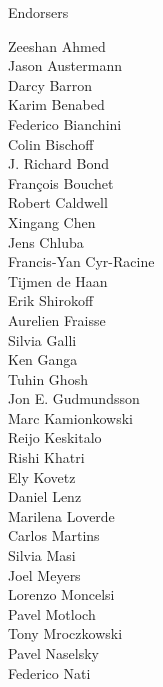 \documentclass[PICOReport.tex]{subfiles}
\begin{document}
\Large { \centerline {Endorsers}}

\footnotesize {

\begin{multicols}{4}
Zeeshan Ahmed                   \\
Jason Austermann                \\
Darcy Barron                    \\
Karim Benabed                   \\
Federico Bianchini              \\
Colin Bischoff                  \\
J. Richard Bond                 \\
Fran\c{c}ois Bouchet            \\
Robert Caldwell                 \\
Xingang Chen                    \\
Jens Chluba                     \\
Francis-Yan Cyr-Racine          \\
Tijmen de Haan                  \\
Erik Shirokoff                  \\
Aurelien Fraisse                \\
Silvia Galli                    \\
Ken Ganga                       \\
Tuhin Ghosh                     \\
Jon E. Gudmundsson              \\
Marc Kamionkowski               \\
Reijo Keskitalo                 \\
Rishi Khatri                    \\
Ely Kovetz                      \\
Daniel Lenz                     \\
Marilena Loverde                \\
Carlos Martins                  \\
Silvia Masi                     \\
Joel Meyers                     \\
Lorenzo Moncelsi                \\
Pavel Motloch                   \\
Tony Mroczkowski                \\
Pavel Naselsky                  \\
Federico Nati                   \\

\end{multicols}}
\end{document}
